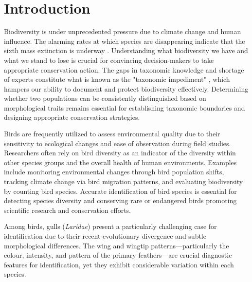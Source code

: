 \documentclass[a4paper,12pt]{report}
\begin{document}
\newpage
\tableofcontents



\newpage
\cleardoublepage %
\setcounter{page}{1} %

\chapter{Introduction}

Biodiversity is under unprecedented pressure due to climate change and human influence. The alarming rates at which species are disappearing indicate that the sixth mass extinction is underway \citep{Ceballos2017}. Understanding what biodiversity we have and what we stand to lose is crucial for convincing decision-makers to take appropriate conservation action. The gaps in taxonomic knowledge and shortage of experts constitute what is known as the "taxonomic impediment" \citep{taxonomicimpediment}, which hampers our ability to document and protect biodiversity effectively. Determining whether two populations can be consistently distinguished based on morphological traits remains essential for establishing taxonomic boundaries and designing appropriate conservation strategies.

Birds are frequently utilized to assess environmental quality due to their sensitivity to ecological changes and ease of observation during field studies. Researchers often rely on bird diversity as an indicator of the diversity within other species groups and the overall health of human environments. Examples include monitoring environmental changes through bird population shifts, tracking climate change via bird migration patterns, and evaluating biodiversity by counting bird species. Accurate identification of bird species is essential for detecting species diversity and conserving rare or endangered birds promoting scientific research and conservation efforts.\citep{ani13020264}

Among birds, gulls (\textit{Laridae}) present a particularly challenging case for identification due to their recent evolutionary divergence and subtle morphological differences. The wing and wingtip patterns—particularly the colour, intensity, and pattern of the primary feathers—are crucial diagnostic features for identification, yet they exhibit considerable variation within each species. 
\end{document}
